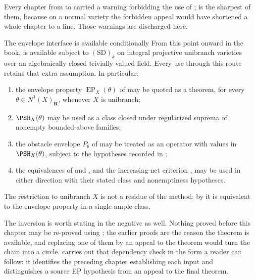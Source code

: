 Every chapter from  to
 carried a warning forbidding the
use of ;  is the
sharpest of them, because on a normal variety the forbidden appeal would
have shortened a whole chapter to a line.  Those warnings are discharged
here.

\begin{important}{The envelope interface is available conditionally}
\label{imp:ch45-firewall-discharged}
From this point onward in the book,  is
available subject to $\mathrm{(SD)}_k$ on integral projective unibranch
varieties over an algebraically closed trivially valued field. Every use
through this route retains that extra assumption. In particular:
\begin{enumerate}
\item the envelope property $\operatorname{EP}_X(\theta)$ of
       may be quoted as a theorem, for every
      $\theta\in N^1(X)_{\mathbf R}$, whenever $X$ is unibranch;
\item $\PSH_X(\theta)$ may be used as a class closed under regularized
      suprema of nonempty bounded-above families;
\item the obstacle envelope $P_\theta$ of
       may be treated as an operator with
      values in $\PSH_X(\theta)$, subject to the hypotheses recorded in
      ;
\item the equivalences of  and
      , and the increasing-net
      criterion , may be used in either
      direction with their stated class and nonemptiness hypotheses.
\end{enumerate}
The restriction to unibranch $X$ is not a residue of the method:
by  it is equivalent to the
envelope property in a single ample class.
\end{important}

The inversion is worth stating in the negative as well.  Nothing proved
before this chapter may be re-proved using
; the earlier proofs are the reason the theorem
is available, and replacing one of them by an appeal to the theorem would
turn the chain into a circle.   carries out that
dependency check in the form a reader can follow: it identifies the
preceding chapter establishing each input and distinguishes a source EP
hypothesis from an appeal to the final theorem.

